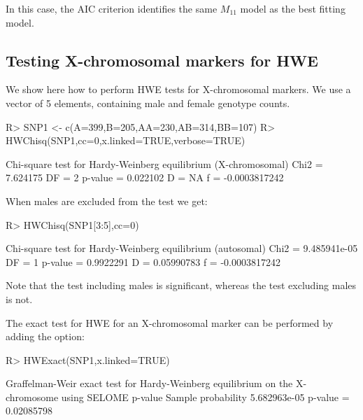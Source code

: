 \documentclass[nojss]{jss}
\begin{document}
In this case, the AIC criterion identifies the same $M_{11}$ model as the best fitting model.


\subsection{Testing X-chromosomal markers for HWE}
\label{subsec:testingx}

We show here how to perform HWE tests for X-chromosomal markers. We use a vector of 5
elements, containing male and female genotype counts.

\begin{Schunk}
\begin{Sinput}
R> SNP1 <- c(A=399,B=205,AA=230,AB=314,BB=107) 
R> HWChisq(SNP1,cc=0,x.linked=TRUE,verbose=TRUE)
\end{Sinput}
\begin{Soutput}
Chi-square test for Hardy-Weinberg equilibrium (X-chromosomal)
Chi2 =  7.624175 DF = 2 p-value =  0.022102 D =  NA f =  -0.0003817242 
\end{Soutput}
\end{Schunk}

When males are excluded from the test we get:

\begin{Schunk}
\begin{Sinput}
R> HWChisq(SNP1[3:5],cc=0)
\end{Sinput}
\begin{Soutput}
Chi-square test for Hardy-Weinberg equilibrium (autosomal)
Chi2 =  9.485941e-05 DF =  1 p-value =  0.9922291 D =  0.05990783 f =  -0.0003817242 
\end{Soutput}
\end{Schunk}

Note that the test including males is significant, whereas the test excluding males is not.

The exact test for HWE for an X-chromosomal marker can be performed by adding the  
option:

\begin{Schunk}
\begin{Sinput}
R> HWExact(SNP1,x.linked=TRUE)
\end{Sinput}
\begin{Soutput}
Graffelman-Weir exact test for Hardy-Weinberg equilibrium on the X-chromosome
using SELOME p-value
Sample probability 5.682963e-05 p-value =  0.02085798 
\end{Soutput}
\end{Schunk}
\end{document}
